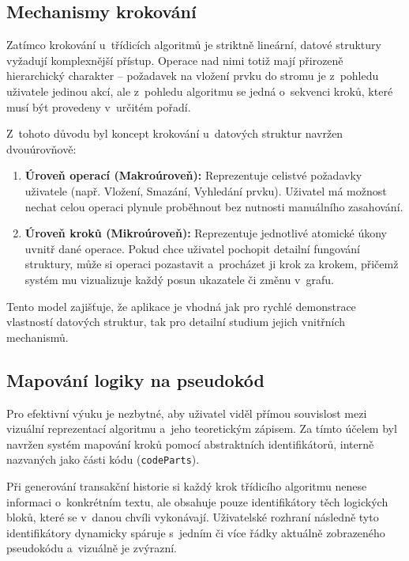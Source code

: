 \subsection{Mechanismy krokování}
\label{subsec:stepping-mechanisms}

Zatímco krokování u~třídicích algoritmů je striktně lineární, datové struktury vyžadují komplexnější přístup.
Operace nad nimi totiž mají přirozeně hierarchický charakter -- požadavek na vložení prvku do stromu je z~pohledu uživatele jedinou akcí, ale z~pohledu algoritmu se jedná o~sekvenci kroků, které musí být provedeny v~určitém pořadí.

Z~tohoto důvodu byl koncept krokování u~datových struktur navržen dvouúrovňově:
\begin{enumerate}
    \item \textbf{Úroveň operací (Makroúroveň):} Reprezentuje celistvé požadavky uživatele (např. Vložení, Smazání, Vyhledání prvku). Uživatel má možnost nechat celou operaci plynule proběhnout bez nutnosti manuálního zasahování.
    \item \textbf{Úroveň kroků (Mikroúroveň):} Reprezentuje jednotlivé atomické úkony uvnitř dané operace. Pokud chce uživatel pochopit detailní fungování struktury, může si operaci pozastavit a~procházet ji krok za krokem, přičemž systém mu vizualizuje každý posun ukazatele či změnu v~grafu.
\end{enumerate}

Tento model zajišťuje, že aplikace je vhodná jak pro rychlé demonstrace vlastností datových struktur, tak pro detailní studium jejich vnitřních mechanismů.

\subsection{Mapování logiky na pseudokód}
\label{subsec:pseudocode-mapping}

Pro efektivní výuku je nezbytné, aby uživatel viděl přímou souvislost mezi vizuální reprezentací algoritmu a~jeho teoretickým zápisem.
Za tímto účelem byl navržen systém mapování kroků pomocí abstraktních identifikátorů, interně nazvaných jako části kódu (\texttt{codeParts}).

Při generování transakční historie si každý krok třídicího algoritmu nenese informaci o~konkrétním textu, ale obsahuje pouze identifikátory těch logických bloků, které se v~danou chvíli vykonávají.
Uživatelské rozhraní následně tyto identifikátory dynamicky spáruje s~jedním či více řádky aktuálně zobrazeného pseudokódu a~vizuálně je zvýrazní.

